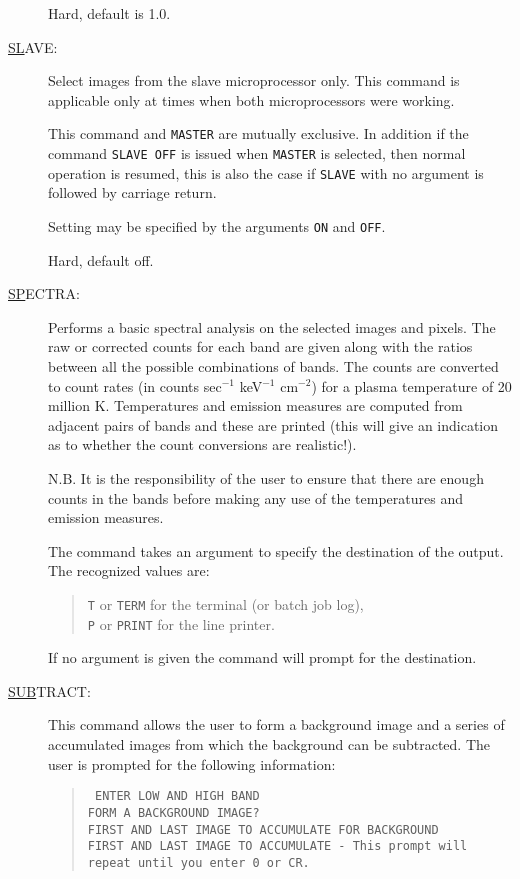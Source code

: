 \begin{description}
Hard, default is 1.0.

\item[\underline{SL}AVE: ] \label{sl}
Select images from the slave microprocessor only. This command is
applicable only at times when both microprocessors were working.

This command and {\tt MASTER} are mutually exclusive.  In addition if
the command {\tt SLAVE~OFF} is issued when {\tt MASTER} is selected,
then normal operation is resumed, this is also the case if {\tt SLAVE}
with no argument is followed by carriage return.

Setting may be specified by the arguments {\tt ON} and {\tt OFF}.

Hard, default off.

\item[\underline{SP}ECTRA: ] \label{sp}
Performs a basic spectral analysis on the selected images and pixels.
The raw or corrected counts for each band are given along with the
ratios between all the possible combinations of bands. The counts are
converted to count rates (in counts sec$^{-1}$ keV$^{-1}$ cm$^{-2}$)
for a plasma temperature of 20 million K. Temperatures and emission
measures are computed from adjacent pairs of bands and these are
printed (this will give an indication as to whether the count
conversions are realistic!).

N.B. It is the responsibility of the user to ensure that there are
enough counts in the bands before making any use of the temperatures
and emission measures.

The command takes an argument to specify the destination of the output.
The recognized values are:
\begin{quote}
{\tt T} or {\tt TERM} for the terminal (or batch job log),\\ {\tt P} or
{\tt PRINT} for the line printer.
\end{quote}
If no argument is given the command will prompt for the destination.

\item[\underline{SUB}TRACT: ] \label{sub}
This command allows the user to form a background image and a series of
accumulated images from which the background can be subtracted. The
user is prompted for the following information:
\begin{quote}\tt      
ENTER LOW AND HIGH BAND\\ FORM A BACKGROUND IMAGE?\\ FIRST AND LAST
IMAGE TO ACCUMULATE FOR BACKGROUND\\ FIRST AND LAST IMAGE TO ACCUMULATE
{\rm - This prompt will repeat until you enter 0 or CR.}
\end{quote}


\end{description}
